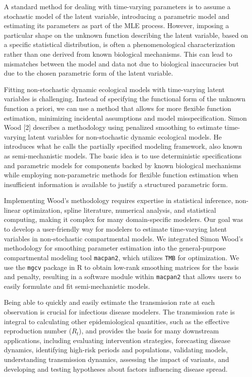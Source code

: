 \documentclass[
11pt, %
oneside, %
english, %
singlespacing, %
]{macthesis} %
\begin{document}
A standard method for dealing with time-varying parameters is to assume a stochastic model of the latent variable, introducing a parametric model and estimating its parameters as part of the MLE process. However, imposing a particular shape on the unknown function describing the latent variable, based on a specific statistical distribution, is often a phenomenological characterization rather than one derived from known biological mechanisms. This can lead to mismatches between the model and data not due to biological inaccuracies but due to the chosen parametric form of the latent variable.

Fitting non-stochastic dynamic ecological models with time-varying latent variables is challenging. Instead of specifying the functional form of the unknown function a priori, we can use a method that allows for more flexible function estimation, minimizing incidental assumptions and model misspecification. Simon Wood {[}2{]} describes a methodology using penalized smoothing to estimate time-varying latent variables for non-stochastic dynamic ecological models. He introduces what he calls the partially specified modeling framework, also known as semi-mechanistic models. The basic idea is to use deterministic specifications and parametric models for components backed by known biological mechanisms while employing non-parametric methods for flexible function estimation when insufficient information is available to justify a structured parametric form.

Implementing Wood's methodology requires expertise in statistical inference, non-linear optimization, spline literature, numerical analysis, and statistical computing, making it complex for many domain-specific modelers. Our goal was to develop a user-friendly way for modelers to estimate time-varying latent variables in non-stochastic compartmental models. We integrated Simon Wood's methodology for smoothing parameter estimation into the general-purpose compartmental modeling tool \texttt{macpan2}, which utilizes \texttt{TMB} for optimization. We use the \texttt{mgcv} package in R to obtain low-rank smoothing matrices for the basis and penalty, resulting in a software module within \texttt{macpan2} that allows users to easily formulate and fit semi-mechanistic models.

Being able to quickly and easily estimate the transmission rate at each observation is crucial for infectious disease modelers. The transmission rate is integral to calculating other epidemiological quantities, such as the effective reproduction number (\(R_t\)), and provides the basis for many downstream applications, including evaluating intervention strategies, forecasting disease dynamics, identifying high-risk periods and populations, validating models, understanding transmission dynamics, assessing the impact of variants, and developing and testing hypotheses about factors influencing disease spread.
\end{document}
